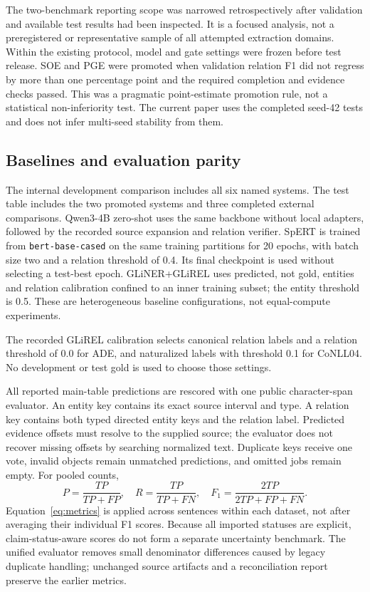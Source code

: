 \documentclass[preprint,12pt]{elsarticle}
\begin{document}
The two-benchmark reporting scope was narrowed retrospectively after validation
and available test results had been inspected. It is a focused analysis, not
a preregistered or representative sample of all attempted extraction domains.
Within the existing protocol, model and gate settings were frozen
before test release. SOE and PGE were promoted when validation relation F1
did not regress by more than one percentage point and the required completion
and evidence checks passed. This was a pragmatic point-estimate promotion
rule, not a statistical non-inferiority test. The current paper uses the
completed seed-42 tests and does not infer multi-seed stability from them.

\subsection{Baselines and evaluation parity}
The internal development comparison includes all six named systems. The test
table includes the two promoted systems and three completed external
comparisons. Qwen3-4B zero-shot uses the same backbone without local adapters,
followed by the recorded source expansion and relation verifier. SpERT is
trained from \texttt{bert-base-cased} on the same training partitions for
20 epochs, with batch size two and a relation threshold of 0.4. Its final
checkpoint is used without selecting a test-best epoch. GLiNER+GLiREL uses
predicted, not gold, entities and relation calibration confined to an inner
training subset; the entity threshold is 0.5. These are heterogeneous baseline
configurations, not equal-compute experiments.

The recorded GLiREL calibration selects canonical relation labels and a
relation threshold of 0.0 for ADE, and naturalized labels with threshold 0.1
for CoNLL04. No development or test gold is used to choose those settings.

All reported main-table predictions are rescored with one public
character-span evaluator. An entity key contains its exact source interval
and type. A relation key contains both typed directed entity keys and the
relation label. Predicted evidence offsets must resolve to the supplied source;
the evaluator does not recover missing offsets by searching normalized text.
Duplicate keys receive one vote, invalid objects remain unmatched predictions,
and omitted jobs remain empty. For pooled counts,
\begin{equation}
P=\frac{TP}{TP+FP},\quad R=\frac{TP}{TP+FN},\quad
F_1=\frac{2TP}{2TP+FP+FN}.
\label{eq:metrics}
\end{equation}
Equation~\eqref{eq:metrics} is applied across sentences within each dataset,
not after averaging their individual F1 scores. Because all imported statuses
are explicit, claim-status-aware scores do not form a separate uncertainty
benchmark. The unified evaluator removes small denominator differences caused
by legacy duplicate handling; unchanged source artifacts and a reconciliation
report preserve the earlier metrics.
\end{document}
